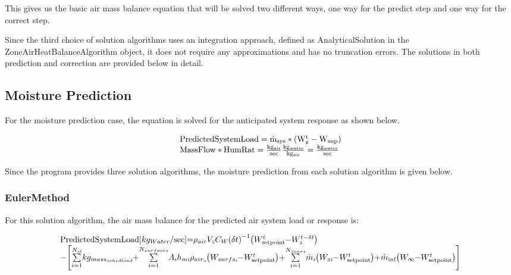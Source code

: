 This gives us the basic air mass balance equation that will be solved two different ways, one way for the predict step and one way for the correct step.

Since the third choice of solution algorithms uses an integration approach, defined as AnalyticalSolution in the ZoneAirHeatBalanceAlgorithm object, it does not require any approximations and has no truncation errors. The solutions in both prediction and correction are provided below in detail.

\subsection{Moisture Prediction}\label{moisture-prediction}

For the moisture prediction case, the equation is solved for the anticipated system response as shown below.

\begin{equation}
\begin{array}{l}
    \rm{PredictedSystemLoad} = \dot{m}_{sys}*\left(W_z^t - W_{sup}\right) \\
    \rm{MassFlow * HumRat} = \frac{kg_{air}}{sec}\frac{kg_{water}}{kg_{air}} = \frac{kg_{water}}{sec}
  \end{array}
\end{equation}

Since the program provides three solution algorithms, the moisture prediction from each solution algorithm is given below.

\subsubsection{EulerMethod}\label{eulermethod-001}

For this solution algorithm, the air mass balance for the predicted air system load or response is:

{\scriptsize
\begin{equation}
\medmuskip=0mu
\thinmuskip=0mu
\thickmuskip=0mu
\nulldelimiterspace=0pt
\scriptspace=0pt
\begin{array}{l}{\rm{PredictedSystemLoad}}\;[k{g_{Water}}/\sec ] = {\rho_{air}}{V_z}{C_W}{\left( {\delta t} \right)^{ - 1}}\left( {W_{{\rm{setpoint}}}^t - W_z^{t - \delta t}} \right) \\
- \left[ {\sum\limits_{i = 1}^{{N_{sl}}} {k{g_{mas{s_{sched\;load}}}}}  + \sum\limits_{i = 1}^{{N_{surfaces}}} {{A_i}{h_{mi}}} {\rho_{ai{r_z}}}\left( {{W_{surf{s_i}}} - W_{{\rm{setpoint}}}^t} \right) + \sum\limits_{i = 1}^{{N_{zones}}} {{{\dot m}_i}} \left( {{W_{zi}} - W_{{\rm{setpoint}}}^t} \right) + {{\dot m}_{\inf }}\left( {{W_\infty } - W_{{\rm{setpoint}}}^t} \right)} \right]\\\;\;\;\;\;\;\;\;\;\;\;\;\;\;\;\;\;\;\;\;\;\;\;\;\;\;\;\;\;\;\;\;\;\;\;\end{array}
\end{equation}}

